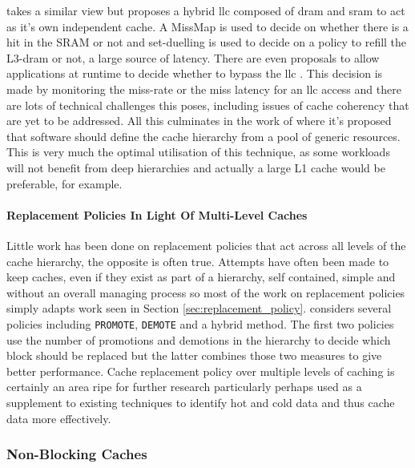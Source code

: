 \citet{hameedAdaptiveCacheManagement2013, hameedReducingLatencySRAM2014} takes a similar view but proposes a hybrid \gls{llc} composed of \gls{dram} and \gls{sram} to act as it's own independent cache. A MissMap \cite{lohEfficientlyEnablingConventional2011} is used to decide on whether there is a hit in the SRAM or not and set-duelling is used to decide on a policy to refill the L3-\gls{dram} or not, a large source of latency. There are even proposals to allow applications at runtime to decide whether to bypass the \gls{llc} \cite{warrierSkipCacheApplicationAware2015}. This decision is made by monitoring the miss-rate or the miss latency for an \gls{llc} access and there are lots of technical challenges this poses, including issues of cache coherency that are yet to be addressed. All this culminates in the work of \citet{tsaiJengaSoftwaredefinedCache2017} where it's proposed that software should define the cache hierarchy from a pool of generic resources. This is very much the optimal utilisation of this technique, as some workloads will not benefit from deep hierarchies and actually a large L1 cache would be preferable, for example. 

\paragraph{Replacement Policies In Light Of Multi-Level Caches}

Little work has been done on replacement policies that act across all levels of the cache hierarchy, the opposite is often true. Attempts have often been made to keep caches, even if they exist as part of a hierarchy, self contained, simple and without an overall managing process so most of the work on replacement policies simply adapts work seen in Section \ref{sec:replacement_policy}. \citet{kelwadeReputationBasedCache2017} considers several policies including \texttt{PROMOTE}, \texttt{DEMOTE} and a hybrid method. The first two policies use the number of promotions and demotions in the hierarchy to decide which block should be replaced but the latter combines those two measures to give better performance. Cache replacement policy over multiple levels of caching is certainly an area ripe for further research particularly perhaps used as a supplement to existing techniques to identify hot and cold data and thus cache data more effectively.

\subsubsection{Non-Blocking Caches}

